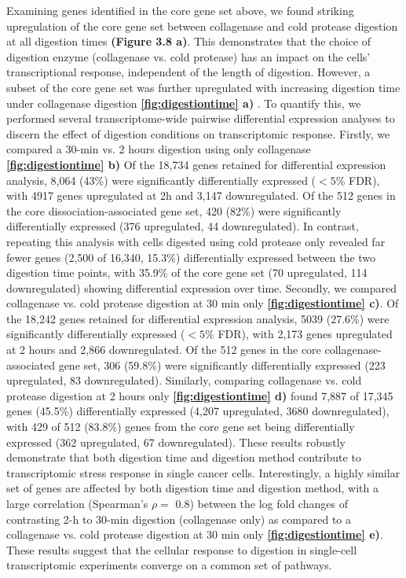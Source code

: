 Examining genes identified in the core gene set above, we found striking upregulation of the core gene set between collagenase and cold protease digestion at all digestion times \textbf{(Figure 3.8 a)}. This demonstrates that the choice of digestion enzyme (collagenase vs. cold protease) has an impact on the cells’ transcriptional response, independent of the length of digestion. However, a subset of the core gene set was further upregulated with increasing digestion time under collagenase digestion \textbf{\autoref{fig:digestiontime} a)} . To quantify this, we performed several transcriptome-wide pairwise differential expression analyses to discern the effect of digestion conditions on transcriptomic response. Firstly, we compared a 30-min vs. 2 hours digestion using only collagenase \textbf{\autoref{fig:digestiontime} b)} Of the 18,734 genes retained for differential expression analysis, 8,064 (43\%) were significantly differentially expressed ($<5\%$ FDR), with 4917 genes upregulated at 2h and 3,147 downregulated. Of the 512 genes in the core dissociation-associated gene set, 420 (82\%) were significantly differentially expressed (376 upregulated, 44 downregulated).
In contrast, repeating this analysis with cells digested using cold protease only revealed far fewer genes (2,500 of 16,340, 15.3\%) differentially expressed between the two digestion time points, with 35.9\% of the core gene set (70 upregulated, 114 downregulated) showing differential expression over time.
Secondly, we compared collagenase vs. cold protease digestion at 30 min only \textbf{\autoref{fig:digestiontime} c)}. Of the 18,242 genes retained for differential expression analysis, 5039 (27.6\%) were significantly differentially expressed ($<5\%$ FDR), with 2,173 genes upregulated at 2 hours and 2,866 downregulated. Of the 512 genes in the core collagenase-associated gene set, 306 (59.8\%) were significantly differentially expressed (223 upregulated, 83 downregulated). Similarly, comparing collagenase vs. cold protease digestion at  2 hours only \textbf{\autoref{fig:digestiontime} d)} found 7,887 of 17,345 genes (45.5\%) differentially expressed (4,207 upregulated, 3680 downregulated), with 429 of 512 (83.8\%) genes from the core gene set being differentially expressed (362 upregulated, 67 downregulated). These results robustly demonstrate that both digestion time and digestion method contribute to transcriptomic stress response in single cancer cells.
Interestingly, a highly similar set of genes are affected by both digestion time and digestion method, with a large correlation (Spearman’s $\rho=$ 0.8) between the log fold changes of contrasting 2-h to 30-min digestion (collagenase only) as compared to a collagenase vs. cold protease digestion at 30 min only \textbf{\autoref{fig:digestiontime} e)}. These results suggest that the cellular response to digestion in single-cell transcriptomic experiments converge on a common set of pathways.


